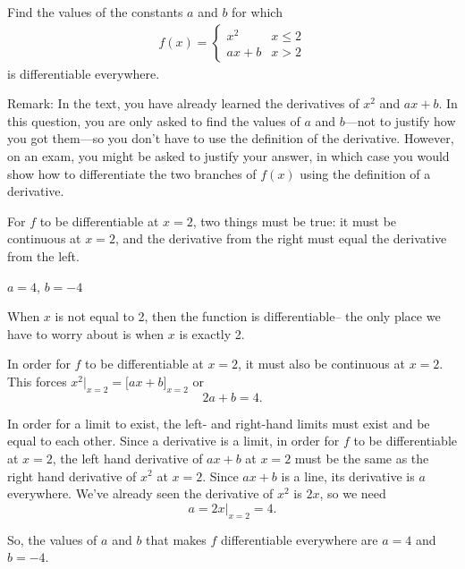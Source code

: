 \begin{Mquestion}[2006H]
Find the values of the constants $a$ and $b$ for which
\begin{align*}
f(x) = \left\{
\begin{array}{lc}
	 x^2 & x\le 2\\
               ax + b   & x > 2
               \end{array}\right.
\end{align*}
is differentiable everywhere.

Remark: In the text, you have already learned the derivatives of $x^2$ and $ax+b$. In this question, you are only asked to find the values of $a$ and $b$---not to justify how you got them---so you don't have to use the definition of the derivative. However, on an exam, you might be asked to justify your answer, in which case you would show how to differentiate the two branches of $f(x)$ using the definition of a derivative.
\end{Mquestion}
\begin{hint}
For $f$ to be differentiable at $x=2$, two things must be true: it must be continuous at $x=2$, and the derivative from the right must equal the derivative from the left.
\end{hint}
\begin{answer}
$a=4$, $b=-4$
\end{answer}
\begin{solution}
When $x$ is not equal to 2, then the function is differentiable-- the only place we have to worry about is when $x$ is exactly 2.

In order for $f$ to be differentiable at $x=2$, it must also
be continuous at $x=2$. This forces $x^2\big|_{x=2}=\big[ax+b\big]_{x=2}$
or \[2a+b=4.\]

In order for a limit to exist, the left- and right-hand limits must exist and be equal to each other. Since a derivative is a limit, in order for $f$ to be differentiable at $x=2$, the left hand
derivative of $ax+b$ at $x=2$ must be
the same as the right hand derivative of $x^2$ at $x=2$.
Since $ax+b$ is a line, its derivative is $a$ everywhere. We've already seen the derivative of $x^2$ is $2x$, so we need
\[a=2x\big|_{x=2}=4.\]

So, the values of $a$ and $b$ that makes $f$ differentiable everywhere are $a=4$ and $b=-4$.
\end{solution}





